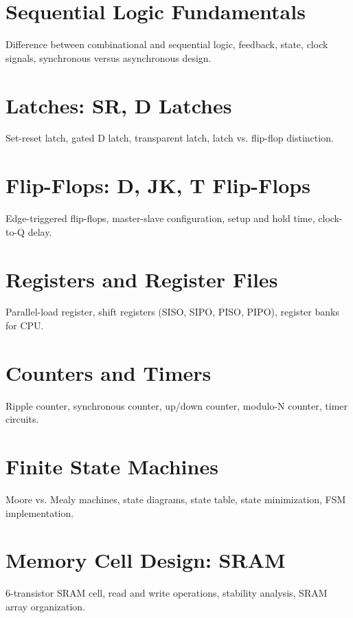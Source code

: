 
\chapter{Sequential Logic Fundamentals}
Difference between combinational and sequential logic, feedback, state, clock signals, synchronous versus asynchronous design.

\chapter{Latches: SR, D Latches}
Set-reset latch, gated D latch, transparent latch, latch vs. flip-flop distinction.

\chapter{Flip-Flops: D, JK, T Flip-Flops}
Edge-triggered flip-flops, master-slave configuration, setup and hold time, clock-to-Q delay.

\chapter{Registers and Register Files}
Parallel-load register, shift registers (SISO, SIPO, PISO, PIPO), register banks for CPU.

\chapter{Counters and Timers}
Ripple counter, synchronous counter, up/down counter, modulo-N counter, timer circuits.

\chapter{Finite State Machines}
Moore vs. Mealy machines, state diagrams, state table, state minimization, FSM implementation.


\chapter{Memory Cell Design: SRAM}
6-transistor SRAM cell, read and write operations, stability analysis, SRAM array organization.

